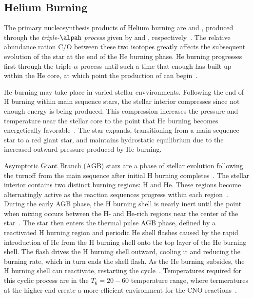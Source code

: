 \subsection{Helium Burning}

The primary nucleosynthesis products of Helium burning are  and
, produced through the \emph{triple-$\alpah$ process} given by
 and
,
respectively~\cite{Aliotta2016}. The relative abundance ration C/O between
these two isotopes greatly affects the subsequent evolution of the star at the
end of the He burning phase. He burning progresses first through the
triple-$\alpha$ process until such a time that enough  has built up
within the He core, at which point the production of  can
begin~\cite{Aliotta2016}.

He burning may take place in varied stellar envvironments. Following the end of
H burning within main sequence stars, the stellar interior compresses since not
enough energy is being produced. This compression increases the pressure and
temperature near the stellar core to the point that He burning becomes
energetically favorable~\cite{CarrollOstlie}. The star expands, transitioning
from a main sequence star to a red giant star, and maintains hydrostatic
equilibrium due to the increased outward pressure produced by He burning.

Asymptotic Giant Branch (AGB) stars are a phase of stellar evolution following
the turnoff from the main sequence after initial H burning
completes~\cite{CarrollOstlie}. The stellar interior contains two distinct
burning regions: H and He. These regions become alternatingly active as the
reaction sequences progress within each region~\cite{Aliotta2016}. During the
early AGB phase, the H burning shell is nearly inert until the point when
mixing occurs between the H- and He-rich regions near the center of the
star~\cite{CarrollOstlie}. The star then enters the thermal pulse AGB phase,
defined by a reactivated H burning region and periodic He shell flashes caused
by the rapid introduction of He from the H burning shell onto the top layer of
the He burning shell. The flash drives the H burning shell outward, cooling it
and reducing the burning rate, which in turn ends the shell flash. As the
He burning subsides, the H burning shell can reactivate, restarting the
cycle~\cite{CarrollOstlie}. Temperatures required for this cyclic process are
in the $T_6 = 20 - 60$ temperature range, where termeratures at the higher end
create a more-efficient environment for the CNO reactions~\cite{Boeltzig2016}.

